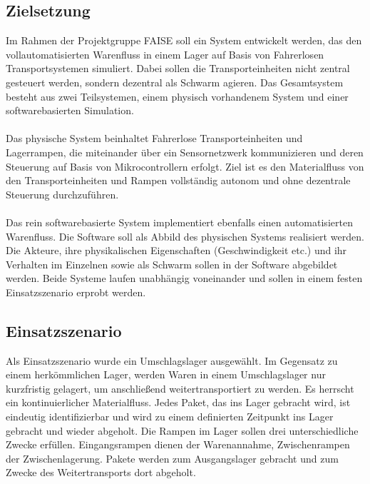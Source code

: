 \subsection{Zielsetzung}
Im Rahmen der Projektgruppe FAISE soll ein System entwickelt werden, das den vollautomatisierten Warenfluss in einem Lager auf Basis von Fahrerlosen Transportsystemen simuliert. Dabei sollen die Transporteinheiten nicht zentral gesteuert werden, sondern dezentral als Schwarm agieren.
Das Gesamtsystem besteht aus zwei Teilsystemen, einem physisch vorhandenem System und einer softwarebasierten Simulation. 
\\\\
Das physische System beinhaltet Fahrerlose Transporteinheiten und Lagerrampen, die miteinander über ein Sensornetzwerk kommunizieren und deren Steuerung auf Basis von Mikrocontrollern erfolgt. Ziel ist es den Materialfluss von den Transporteinheiten und Rampen vollständig autonom und ohne dezentrale Steuerung durchzuführen. 
\\\\
Das rein softwarebasierte System implementiert ebenfalls einen automatisierten Warenfluss. Die Software soll als Abbild des physischen Systems realisiert werden. Die Akteure, ihre physikalischen Eigenschaften (Geschwindigkeit etc.) und ihr Verhalten im Einzelnen sowie als Schwarm sollen in der Software abgebildet werden. Beide Systeme laufen unabhängig voneinander und sollen in einem festen Einsatzszenario erprobt werden.

\subsection{Einsatzszenario}
Als Einsatzszenario wurde ein Umschlagslager ausgewählt. Im Gegensatz zu einem herkömmlichen Lager, werden Waren in einem Umschlagslager nur kurzfristig gelagert, um anschließend weitertransportiert zu werden. Es herrscht ein kontinuierlicher Materialfluss. Jedes Paket, das ins Lager gebracht wird, ist eindeutig identifizierbar und wird zu einem definierten Zeitpunkt ins Lager gebracht und wieder abgeholt. Die Rampen im Lager sollen drei unterschiedliche Zwecke erfüllen. Eingangsrampen dienen der Warenannahme, Zwischenrampen der Zwischenlagerung. Pakete werden zum Ausgangslager gebracht und zum Zwecke des Weitertransports dort abgeholt.
